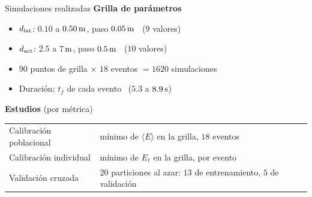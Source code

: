 \begin{frame}{Simulaciones realizadas}
  \textbf{Grilla de parámetros}
  \begin{itemize}\setlength{\itemsep}{3pt}
    \item $d_{\mathrm{lat}}$: $0.10$ a $0.50\,\mathrm{m}$, paso $0.05\,\mathrm{m}$ \ ($9$ valores)
    \item $d_{\mathrm{act}}$: $2.5$ a $7\,\mathrm{m}$, paso $0.5\,\mathrm{m}$ \ ($10$ valores)
    \item $90$ puntos de grilla $\times$ $18$ eventos $= 1620$ simulaciones
    \item Duración: $t_f$ de cada evento \ ($5.3$ a $8.9\,\mathrm{s}$)
  \end{itemize}
  \vspace{8pt}
  \textbf{Estudios} (por métrica)
  \vspace{3pt}

  \centering
  \begin{tabular}{ll}
    \hline
    Calibración poblacional & mínimo de $\langle E\rangle$ en la grilla, $18$ eventos \\
    Calibración individual  & mínimo de $E_\ell$ en la grilla, por evento \\
    Validación cruzada      & $20$ particiones al azar: $13$ de entrenamiento, $5$ de validación \\
    \hline
  \end{tabular}
\end{frame}
